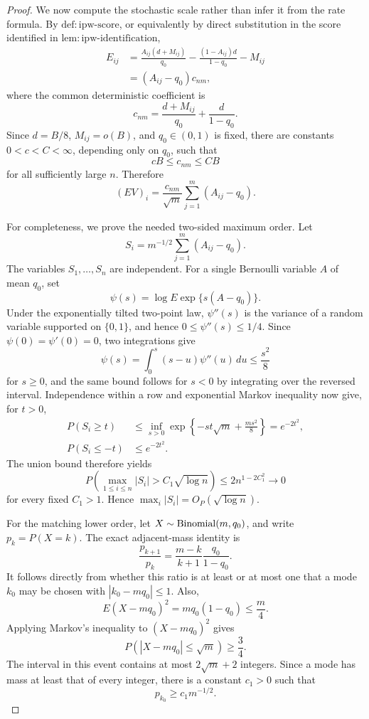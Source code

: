 \documentclass{article}
\begin{document}
\begin{proof}
We now compute the stochastic scale rather than infer it from the rate formula.  By \(\mathrm{def:ipw\mbox{-}score}\), or equivalently by direct substitution in the score identified in \(\mathrm{lem:ipw\mbox{-}identification}\),
\[
 \begin{aligned}
 E_{ij}
 &=\frac{A_{ij}(d+M_{ij})}{q_0}
   -\frac{(1-A_{ij})d}{1-q_0}-M_{ij}\\
 &=(A_{ij}-q_0)c_{nm},
 \end{aligned}
\]
where the common deterministic coefficient is
\[
 c_{nm}
 =\frac{d+M_{ij}}{q_0}+\frac d{1-q_0}.
\]
Since \(d=B/8\), \(M_{ij}=o(B)\), and \(q_0\in(0,1)\) is fixed, there are constants \(0<c<C<\infty\), depending only on \(q_0\), such that
\[
 cB\le c_{nm}\le CB
\]
for all sufficiently large \(n\).  Therefore
\[
 (EV)_i
 =\frac{c_{nm}}{\sqrt m}\sum_{j=1}^m(A_{ij}-q_0).
\]

For completeness, we prove the needed two-sided maximum order.  Let
\[
 S_i=m^{-1/2}\sum_{j=1}^m(A_{ij}-q_0).
\]
The variables \(S_1,\ldots,S_n\) are independent.  For a single Bernoulli variable \(A\) of mean \(q_0\), set
\[
 \psi(s)=\log E\exp\{s(A-q_0)\}.
\]
Under the exponentially tilted two-point law, \(\psi''(s)\) is the variance of a random variable supported on \(\{0,1\}\), and hence \(0\le\psi''(s)\le1/4\).  Since \(\psi(0)=\psi'(0)=0\), two integrations give
\[
 \psi(s)=\int_0^s(s-u)\psi''(u)\,du\le\frac{s^2}{8}
\]
for \(s\ge0\), and the same bound follows for \(s<0\) by integrating over the reversed interval.  Independence within a row and exponential Markov inequality now give, for \(t>0\),
\[
 \begin{aligned}
 P(S_i\ge t)
 &\le\inf_{s>0}
 \exp\left\{-st\sqrt m+\frac{ms^2}{8}\right\}
 =e^{-2t^2},\\
 P(S_i\le-t)&\le e^{-2t^2}.
 \end{aligned}
\]
The union bound therefore yields
\[
 P\!\left(\max_{1\le i\le n}|S_i|>C_1\sqrt{\log n}\right)
 \le2n^{1-2C_1^2}\longrightarrow0
\]
for every fixed \(C_1>1\).  Hence \(\max_i|S_i|=O_P(\sqrt{\log n})\).

For the matching lower order, let \(X\sim{\rm Binomial}(m,q_0)\), and write \(p_k=P(X=k)\).  The exact adjacent-mass identity is
\[
 \frac{p_{k+1}}{p_k}
 =\frac{m-k}{k+1}\frac{q_0}{1-q_0}.
\]
It follows directly from whether this ratio is at least or at most one that a mode \(k_0\) may be chosen with \(|k_0-mq_0|\le1\).  Also,
\[
 E(X-mq_0)^2=mq_0(1-q_0)\le\frac m4.
\]
Applying Markov's inequality to \((X-mq_0)^2\) gives
\[
 P(|X-mq_0|\le\sqrt m)\ge\frac34.
\]
The interval in this event contains at most \(2\sqrt m+2\) integers.  Since a mode has mass at least that of every integer, there is a constant \(c_1>0\) such that
\[
 p_{k_0}\ge c_1m^{-1/2}.
\]


\end{proof}
\end{document}
